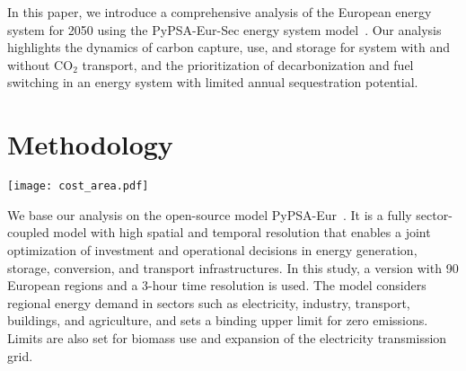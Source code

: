 \documentclass[twocolumn]{article}
\newcommand{\carbon}{CO$_2$}
\newcommand{\hydrogen}{H$_2$}
\begin{document}
In this paper, we introduce a comprehensive analysis of the European energy system for 2050 using the PyPSA-Eur-Sec energy system model~\cite{bakkenLinearModelsOptimization2008,morbeeOptimisedDeploymentEuropean2012,oeiModelingCarbonCapture2014,elahiMultiperiodLeastCost2014,burandtDecarbonizingChinaEnergy2019,middletonSimCCSOpensourceTool2020,bjerketvedtOptimalDesignCost2020,weiProposedGlobalLayout2021,damoreOptimalDesignEuropean2021,becattiniCarbonDioxideCapture2022}. Our analysis highlights the dynamics of carbon capture, use, and storage for system with and without \carbon{} transport, and the prioritization of decarbonization and fuel switching in an energy system with limited annual sequestration potential.

\section{Methodology}
\label{sec:methodology}


\begin{figure*}[ht!]
    \centering
    \texttt{[image: cost\_area.pdf]}
    \caption[short]{Total annual system cost for the sector-coupled system with different levels of carbon sequestration potential, with (left) and without (right) \carbon{} network. "Gas Infrastructure" combines gas facilities for power and heat production, "H$_2$ Infrastructure" combines H$_2$ production, transport and re-electrification. Regardless of the implementation of a \carbon{} network, the system cost decrease as sequestration increases. Due to an increased flexibility from fossil carriers with subsequent sequestration, the need for FT synthesis and \hydrogen{} electrolysis and the corresponding renewable power supply is reduced.
    }
    \label{fig:cost_area}
\end{figure*}


We base our analysis on the open-source model PyPSA-Eur~\cite{PyPSAEurSecSectorCoupledOpen2023}. It is a fully sector-coupled model with high spatial and temporal resolution that enables a joint optimization of investment and operational decisions in energy generation, storage, conversion, and transport infrastructures. In this study, a version with 90 European regions and a 3-hour time resolution is used. The model considers regional energy demand in sectors such as electricity, industry, transport, buildings, and agriculture, and sets a binding upper limit for zero emissions. Limits are also set for biomass use and expansion of the electricity transmission grid.
\end{document}
